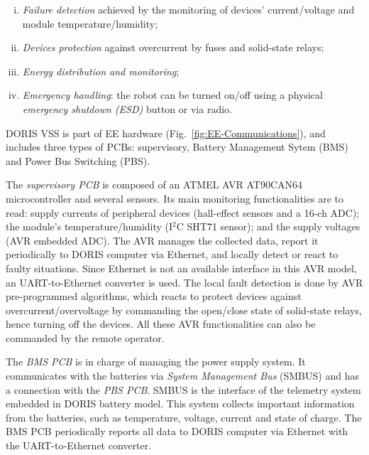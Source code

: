 \documentclass{ifacconf}
\begin{document}
\begin{enumerate}[i)]
    \item \emph{Failure detection} achieved by the monitoring of devices'
    current/voltage and module temperature/humidity;
    \item \emph{Devices protection} against overcurrent by fuses and
    solid-state relays;
    \item \emph{Energy distribution and monitoring};
    \item \emph{Emergency handling}: the robot can be turned on/off using a physical
    \emph{emergency shutdown (ESD)} button or via radio. 
  \end{enumerate}

DORIS VSS is part of EE hardware (Fig.~\ref{fig:EE-Communications}), and
includes three types of PCBs: supervisory, Battery Management Sytem (BMS) and
Power Bus Switching (PBS).

The \emph{supervisory PCB} is composed of an ATMEL AVR AT90CAN64
microcontroller and several sensors. Its main monitoring functionalities are to
read: supply currents of peripheral devices (hall-effect sensors and a 16-ch
ADC); the module's temperature/humidity (I$^{2}$C SHT71 sensor); and the supply
voltages (AVR embedded ADC). The AVR manages the collected data, report it
periodically to DORIS computer via Ethernet, and locally detect or react to
faulty situations. Since Ethernet is not an available interface in this AVR
model, an UART-to-Ethernet converter is used. The local fault detection is done
by AVR pre-programmed algorithms, which reacts to protect devices against
overcurrent/overvoltage by commanding the open/close state of
solid-state relays, hence turning off the devices. All these AVR
functionalities can also be commanded by the remote operator. 

The \emph{BMS PCB} is in charge of managing the power supply system. It
communicates with the batteries via \emph{System Management Bus} (SMBUS) and
has a connection with the \emph{PBS PCB}. SMBUS is the interface of
the telemetry system embedded in DORIS battery model. This system collects
important information from the batteries, such as temperature, voltage, current
and state of charge. The BMS PCB periodically reports all data to DORIS computer
via Ethernet with the UART-to-Ethernet converter.
\end{document}
